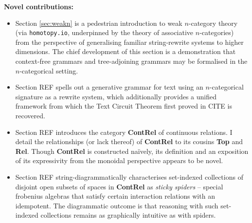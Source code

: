 


\thispagestyle{empty}%
\maketitle%


\tableofcontents{}

\newpage
\vfill
\begin{myboxB}
\centering
\textbf{Novel contributions:}
\begin{itemize}

\item Section \ref{sec:weakn} is a pedestrian introduction to weak $n$-category theory (via \texttt{homotopy.io}, underpinned by the theory of associative $n$-categories) from the perspective of generalising familiar string-rewrite systems to higher dimensions. The chief development of this section is a demonstration that context-free grammars and tree-adjoining grammars may be formalised in the $n$-categorical setting.

\item Section \bR REF \e spells out a generative grammar for text using an $n$-categorical signature as a rewrite system, which additionally provides a unified framework from which the Text Circuit Theorem first proved in \bR CITE \e is recovered.

\item Section \bR REF \e introduces the category \textbf{ContRel} of continuous relations. I detail the relationships (or lack thereof) of \textbf{ContRel} to its cousins \textbf{Top} and \textbf{Rel}. Though \textbf{ContRel} is constructed na\"{i}vely, its definition and an exposition of its expressivity from the monoidal perspective appears to be novel.

\item Section \bR REF \e string-diagrammatically characterises set-indexed collections of disjoint open subsets of spaces in \textbf{ContRel} as \emph{sticky spiders} -- special frobenius algebras that satisfy certain interaction relations with an idempotent. The diagrammatic outcome is that reasoning with such set-indexed collections remains as graphically intuitive as with spiders.


\end{itemize}
\end{myboxB}
